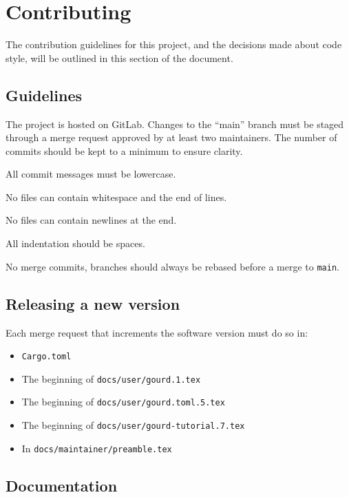 \pagebreak


\section{Contributing}

The contribution guidelines for this project, and the decisions made about code style,
will be outlined in this section of the document.

\subsection{Guidelines}

The project is hosted on GitLab.
Changes to the ``main'' branch must be staged through a merge request approved by at least two maintainers.
The number of commits should be kept to a minimum to ensure clarity.

All commit messages must be lowercase.

No files can contain whitespace and the end of lines.

No files can contain newlines at the end.

All indentation should be spaces.

No merge commits, branches should always be rebased before a merge to \texttt{main}.

\subsection{Releasing a new version}

Each merge request that increments the software version must do so in:

\begin{itemize}
  \item \texttt{Cargo.toml}
  \item The beginning of \texttt{docs/user/gourd.1.tex}
  \item The beginning of \texttt{docs/user/gourd.toml.5.tex}
  \item The beginning of \texttt{docs/user/gourd-tutorial.7.tex}
  \item In \texttt{docs/maintainer/preamble.tex}
\end{itemize}

\subsection{Documentation}

